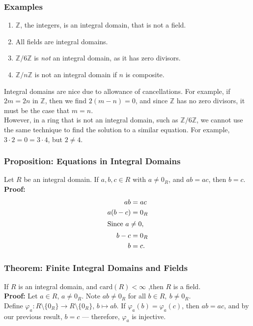 \documentclass[8pt]{extarticle}
\newcommand{\card}{\text{card}}
\newcommand{\Z}{\mathbb{Z}}
\begin{document}
  \subsubsection{Examples}%
  \begin{enumerate}[(1)]
    \item $\Z$, the integers, is an integral domain, that is not a field.
    \item All fields are integral domains.
    \item $\Z/6\Z$ is \textit{not} an integral domain, as it has zero divisors.
    \item $\Z/n\Z$ is not an integral domain if $n$ is composite.
  \end{enumerate}
  Integral domains are nice due to allowance of cancellations. For example, if $2m = 2n$ in $\Z$, then we find $2(m-n) = 0$, and since $\Z$ has no zero divisors, it must be the case that $m=n$.\\

  However, in a ring that is not an integral domain, such as $\Z/6\Z$, we cannot use the same technique to find the solution to a similar equation. For example, $3\cdot 2 = 0 = 3\cdot 4$, but $2\neq 4$.
  \subsubsection{Proposition: Equations in Integral Domains}%
  Let $R$ be an integral domain. If $a,b,c\in R$ with $a\neq 0_R$, and $ab = ac$, then $b=c$.\\

  \textbf{Proof:}
  \begin{align*}
    ab &= ac\\
    a(b-c) &= 0_R\\
    \shortintertext{Since $a\neq 0$,}
    b-c &= 0_R\\
    b &= c.
  \end{align*}
  \subsubsection{Theorem: Finite Integral Domains and Fields}%
  If $R$ is an integral domain, and $\card(R) < \infty$ ,then $R$ is a field.\\

  \textbf{Proof:} Let $a\in R$, $a\neq 0_{R}$. Note $ab \neq 0_R$ for all $b\in R,~b\neq 0_R$.\\

  Define $\varphi_a: R\setminus\{0_R\} \rightarrow R\setminus\{0_R\}$, $b\mapsto ab$. If $\varphi_a(b) = \varphi_a(c)$, then $ab = ac$, and by our previous result, $b=c$ --- therefore, $\varphi_a$ is injective.\\
\end{document}
